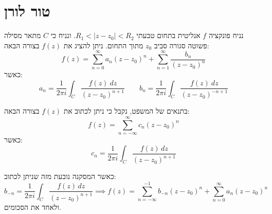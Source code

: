 \documentclass{tstextbook}
\begin{document}
\section{טור לורן}

\begin{theorem}[לורן]
נניח פונקציה \(f\) אנליטית בתחום טבעתי \(R_{1} < |z-z_{0}|< R_{2}\). ונניח כי \(C\) מתאר מסילה פשוטה סגורה סביב \(z_{0}\) מתוך התחום. ניתן להציג את \(f(z)\) בצורה הבאה:
$$f(z)=\sum_{n=0}^{\infty}a_{n}(z-z_{0})^{n}+\sum_{n=1}^{\infty}\frac{b_{n}}{(z-z_{0})^{n}}$$
כאשר:
$$a_{n}={\frac{1}{2\pi i}}\int_{C}{\frac{f(z)\ d z}{(z-z_{0})^{n+1}}} \qquad b_{n}=\frac{1}{2\pi i}\int_{C}\frac{f(z)\ d z}{(z-z_{0})^{-n+1}}$$

\end{theorem}
\begin{corollary}
בתנאים של המשפט, נקבל כי ניתן לכתוב את \(f(z)\) בצורה הבאה:
$$f(z)=\sum_{n=-\infty}^{\infty}c_{n}(z-z_{0})^{n}$$
כאשר:
$$c_{n}=\frac{1}{2\pi i}\int_{C}\frac{f(z)\,d z}{(z-z_{0})^{n+1}}$$

\end{corollary}
כאשר המסקנה נובעת מזה שניתן לכתוב:
$$b_{-n}=\frac{1}{2\pi i}\int_{C}\frac{f(z)\,d z}{(z-z_{0})^{n+1}}\implies f(z)=\sum_{n=-\infty}^{-1}b_{-n}(z-z_{0})^{n}+\sum_{n=0}^{\infty}a_{n}(z-z_{0})^{n}$$
ולאחד את הסכומים.
\end{document}
